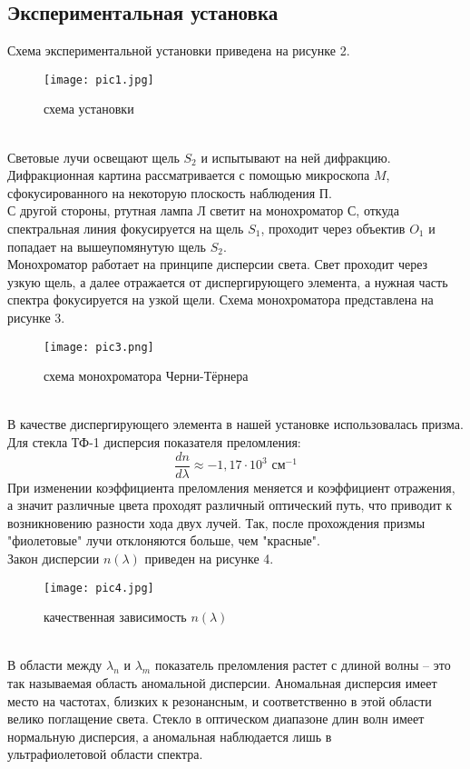 \documentclass[12pt]{article}
\begin{document}
	 \subsection{Экспериментальная установка}
	 Схема экспериментальной установки приведена на рисунке 2.
	  \begin{figure}[h]
	 	\centering	
	 	\texttt{[image: pic1.jpg]}
	 	\caption{схема установки}
	 \end{figure}\\
 
Световые лучи освещают щель $S_2$ и испытывают на ней дифракцию. Дифракционная картина рассматривается с помощью микроскопа $M$, сфокусированного на некоторую плоскость наблюдения П. \\
С другой стороны, ртутная лампа Л светит на монохроматор С, откуда спектральная линия фокусируется на щель $S_1$, проходит через объектив $O_1$ и попадает на вышеупомянутую щель $S_2$.\\
	Монохроматор работает на принципе дисперсии света. Свет проходит через узкую щель, а далее отражается от диспергирующего элемента, а нужная часть спектра фокусируется на узкой щели. Схема монохроматора представлена на рисунке 3. 
	 \begin{figure}[h]
		\centering	
		\texttt{[image: pic3.png]}
		\caption{схема монохроматора Черни-Тёрнера}
	\end{figure}\\
	В качестве диспергирующего элемента в нашей установке использовалась призма. Для стекла ТФ-1 дисперсия показателя преломления: \[
	\frac{dn}{d\lambda} \approx -1,17 \cdot 10^3 \mbox{ см}^{-1}
	\]
	При изменении коэффициента преломления меняется и коэффициент отражения, а значит различные цвета проходят различный оптический путь, что приводит к возникновению разности хода двух лучей. Так, после прохождения призмы "фиолетовые" лучи отклоняются больше, чем "красные".\\
	Закон дисперсии $n(\lambda)$ приведен на рисунке 4. 
		  \begin{figure}[h]
		\centering	
		\texttt{[image: pic4.jpg]}
		\caption{качественная зависимость $n(\lambda)$}
	\end{figure}\\
	В области между $\lambda_n$ и $\lambda_m$ показатель преломления растет с длиной волны -- это так называемая область аномальной дисперсии. Аномальная дисперсия имеет место на частотах, близких к резонансным, и соответственно в этой области велико поглащение света. Стекло в оптическом диапазоне длин волн имеет нормальную дисперсия, а аномальная наблюдается лишь в \\ ультрафиолетовой области спектра.\\
\end{document}
